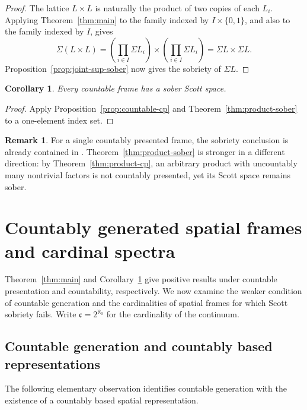 \documentclass[11pt,reqno]{amsart}
\newtheorem{corollary}[theorem]{Corollary}
\theoremstyle{definition}
\newtheorem{remark}[theorem]{Remark}
\numberwithin{equation}{section}
\newcommand{\cc}{\mathfrak{c}}
\begin{document}
\begin{proof}
The lattice $L\times L$ is naturally the product of two copies of each $L_i$.
Applying Theorem~\ref{thm:main} to the family indexed by
$I\times\{0,1\}$, and also to the family indexed by $I$, gives
\[
  \Sigma(L\times L)
  =\left(\prod_{i\in I}\Sigma L_i\right)
   \times\left(\prod_{i\in I}\Sigma L_i\right)
  =\Sigma L\times\Sigma L.
\]
Proposition~\ref{prop:joint-sup-sober} now gives the sobriety of $\Sigma L$.
\end{proof}

\begin{corollary}\label{cor:countable-sober}
Every countable frame has a sober Scott space.
\end{corollary}

\begin{proof}
Apply Proposition~\ref{prop:countable-cp} and
Theorem~\ref{thm:product-sober} to a one-element index set.
\end{proof}

\begin{remark}\label{rem:debrecht-kawai}
For a single countably presented frame, the sobriety conclusion is already
contained in \citet[Corollary~8.6]{deBrechtKawai2019}.
Theorem~\ref{thm:product-sober} is stronger in a different direction: by
Theorem~\ref{thm:product-cp}, an arbitrary product with uncountably many
nontrivial factors is not countably presented, yet its Scott space remains
sober.
\end{remark}

\section{Countably generated spatial frames and cardinal spectra}
\label{sec:cardinal}

Theorem~\ref{thm:main} and Corollary~\ref{cor:countable-sober} give positive
results under countable presentation and countability, respectively. We
now examine the weaker condition of countable generation and the
cardinalities of spatial frames for which Scott sobriety fails. Write
$\cc=2^{\aleph_0}$ for the cardinality of the continuum.

\subsection{Countable generation and countably based representations}

The following elementary observation identifies countable generation
with the existence of a countably based spatial representation.
\end{document}
